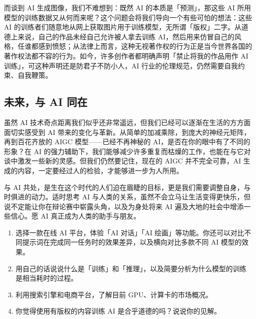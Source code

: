 而谈到 AI 生成图像，我们不难想到：既然 AI 的本质是「预测」，那这些 AI 所用模型的训练数据又从何而来呢？这个问题会将我们导向一个有些可怕的想法：这些 AI 的训练者们随意地从网上获取图片用于训练模型，无所谓「版权」二字。从道德上来说，自己的作品未经自己允许被人拿去训练 AI，然后用来仿冒自己的风格，任谁都感到愤怒；从法律上而言，这种无视著作权的行为正是当今世界各国的著作权法都不容的行为。如今，许多创作者都明确声明「禁止将我的作品用作 AI 训练」，可这种声明还是防君子不防小人，AI 行业的伦理规范，仍然需要自我约束、自我鞭策。

\subsection{未来，与 AI 同在}

虽然 AI 技术奇点距离我们似乎还非常遥远，但我们已经可以逐渐在生活的方方面面切实感受到 AI 带来的变化与革新。从简单的加减乘除，到庞大的神经元矩阵，再到百花齐放的 AIGC 模型——已经不再神秘的 AI，是否在你的眼中有了不同的形象？在 AI 的强力辅助下，我们能够减少许多重复而枯燥的工作，也能在与它对谈中激发一些新的灵感。但我们仍然要记住，现在的 AIGC 并不完全可靠，AI 生成的内容，一定要经过人的检验，才能够进一步为人所用。

与 AI 共处，是生在这个时代的人们迫在眉睫的目标，更是我们需要调整自身，与时俱进的动力。适时思考 AI 与人类的关系，虽然不会立马让生活变得更快乐，但说不定能让你在辩论赛中崭露头角，以及为身处将来 AI 遍及大地的社会中增添一些信心。愿 AI 真正成为人类的助手与朋友。

\practice

\begin{enumerate}
  \item 选择一款在线 AI 平台，体验「AI 对话」「AI 绘画」等功能。你还可以对比不同提示词在完成同一任务时的效果差异，以及横向对比多款不同 AI 模型的效果。
  \item 用自己的话说说什么是「训练」和「推理」，以及简要分析为什么模型的训练是相当耗时的过程。
  \item 利用搜索引擎和电商平台，了解目前 GPU、计算卡的市场概况。
  \item 你觉得使用有版权的内容训练 AI 是合乎道德的吗？说说你的见解。
\end{enumerate}